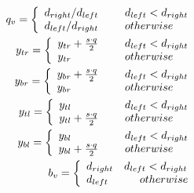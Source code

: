 \begin{align}
 q_v = \left\{ 
	 \begin{array}{ll}
	 {d_{right}}/{d_{left}} &\mbox{\hspace{0.5cm}} d_{left}<d_{right}\\
	 {d_{left}}/{d_{right}} &\mbox{\hspace{0.5cm}} otherwise
	 \end{array} 
\right.\label{eq:points_qv}\\
y_{tr}=\left\{ 
	 \begin{array}{ll}
	 {y_{tr} + \frac{s\cdot q}{2}} &\mbox{\hspace{0.5cm}} d_{left}<d_{right}\\
	 {y_{tr}} &\mbox{\hspace{0.5cm}} otherwise
	 \end{array}\right.\label{eq:points_tr_y}\\
y_{br}=\left\{ 
	 \begin{array}{ll}
	 {y_{br} + \frac{s\cdot q}{2}} &\mbox{\hspace{0.5cm}} d_{left}<d_{right}\\
	 {y_{br}} &\mbox{\hspace{0.5cm}} otherwise
	 \end{array}\right.\label{eq:points_br_y}\\
y_{tl}=\left\{ 
	 \begin{array}{ll}
	 {y_{tl}} &\mbox{\hspace{0.5cm}} d_{left}<d_{right}\\
	 {y_{tl} + \frac{s\cdot q}{2}} &\mbox{\hspace{0.5cm}} otherwise
	 \end{array}\right.\label{eq:points_tl_y}\\
y_{bl}=\left\{ 
	 \begin{array}{ll}
	 {y_{bl}} &\mbox{\hspace{0.5cm}} d_{left}<d_{right}\\
	 {y_{bl} + \frac{s\cdot q}{2}} &\mbox{\hspace{0.5cm}} otherwise
	 \end{array}\right.\label{eq:points_bl_y}\\
b_v    =\left\{ 
	 \begin{array}{ll}
	 d_{right} &d_{left}<d_{right}\\
	 d_{left} &\mbox{\hspace{0.5cm}} otherwise
	 \end{array}\right.\label{eq:points_bv}\\

\end{align}
